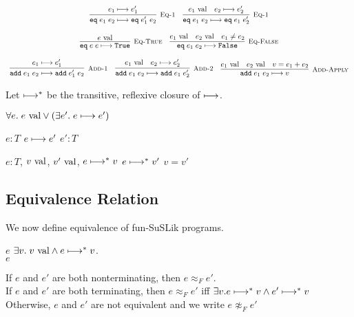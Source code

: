 \documentclass[10pt]{article}
\begin{document}
\[\begin{array}{cc}
    \labinfer[Eq-1]{\eq\; e_1\; e_2 \reduces \eq\; e_1'\; e_2}{e_1 \reduces e_1'}
    ~~~
    \labinfer[Eq-1]{\eq\; e_1\; e_2 \reduces \eq\; e_1\; e_2'}{e_1 \val & e_2 \reduces e_2'}
    \\\\
    \labinfer[Eq-True]{\eq\; e\; e \reduces \True}{e \val}
    ~~~
    \labinfer[Eq-False]{\eq\; e_1\; e_2 \reduces \False}{e_1 \val & e_2 \val & e_1 \neq e_2}
    \\\\
    \labinfer[Add-1]{\add\; e_1\; e_2 \reduces \add\; e_1'\; e_2}{e_1 \reduces e_1'}
    ~~~
    \labinfer[Add-2]{\add\; e_1\; e_2 \reduces \add\; e_1\; e_2'}{e_1 \val & e_2 \reduces e_2'}
    ~~~
    \labinfer[Add-Apply]{\add\; e_1\; e_2 \reduces v}{e_1 \val & e_2 \val & v = e_1 + e_2}

  \end{array}
\]

\noindent
Let $\longmapsto^{*}$ be the transitive, reflexive closure of $\longmapsto$.

\begin{theorem}[Progress]
  $\forall e.\; e \textnormal{ val} \lor (\exists e'.\; e \longmapsto e')$
\end{theorem}

\begin{theorem}[Preservation]
   $e : T$  $e \longmapsto e'$  $e' : T$
\end{theorem}

\begin{theorem}
   $e : T$, $v \textnormal{ val}$, $v' \textnormal{ val}$, $e \longmapsto^{*} v$  $e \longmapsto^{*} v'$  $v = v'$
\end{theorem}

\subsection{Equivalence Relation}
\label{sec:FSEquiv}
We now define equivalence of fun-SuSLik programs.

\begin{definition}[Termination]
  $e$  $\exists v.\; v \textnormal{ val} \land e \longmapsto^{*} v$.\\
  $e$ 
\end{definition}

\begin{definition}
  If $e$ and $e'$ are both nonterminating, then $e \approx_F e'$.\\
  If $e$ and $e'$ are both terminating, then $e \approx_F e'$ iff $\exists v. e \longmapsto^{*} v \land e' \longmapsto^{*} v$\\
  Otherwise, $e$ and $e'$ are not equivalent and we write $e \not\approx_F e'$
\end{definition}
\end{document}
